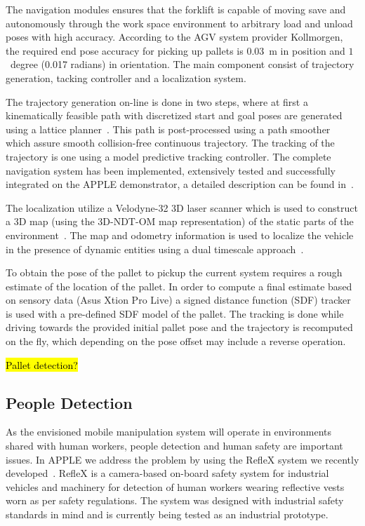 The navigation modules ensures that the forklift is capable of moving save and autonomously through the work space environment to arbitrary load and unload poses with high accuracy. According to the AGV system provider Kollmorgen, the required end pose accuracy
for picking up pallets is $0.03$~m in position and $1$~degree (0.017 radians) in
orientation. The main component consist of trajectory generation, tacking controller and a localization system. 
 
The trajectory generation on-line is done in two steps, where at first a kinematically feasible path with discretized start and goal poses are generated using a lattice planner~\cite{Ciri14}. This path is post-processed using a path smoother~\cite{Andr15} which assure smooth collision-free continuous trajectory. The tracking of the trajectory is one using a model predictive tracking controller. The complete navigation system has been implemented, extensively tested and successfully
integrated on the APPLE demonstrator, a detailed description can be found in~\cite{Andr15}.

The localization utilize a Velodyne-32 3D laser scanner which is used to construct a 3D map (using the 3D-NDT-OM map representation) of the static parts of the environment~\cite{Stoy13}. The map and odometry information is used to localize the vehicle in the presence of dynamic entities using a dual timescale approach~\cite{Vale14}. 

To obtain the pose of the pallet to pickup the current system requires a rough estimate of the location of the pallet. In order to compute a final estimate based on sensory data (Asus Xtion Pro Live) a signed distance function (SDF) tracker~\cite{Cane13} is used with a pre-defined SDF model of the pallet. The tracking is done while driving towards the provided initial pallet pose and the trajectory is recomputed on the fly, which depending on the pose offset may include a reverse operation. 

\hl{Pallet detection?}

%
\subsection{People Detection}
\label{subsec:people_det}
%
As the envisioned mobile manipulation system will operate in environments shared with human workers,
people detection and human safety are important issues. In APPLE we address the problem by using the
RefleX system we recently developed~\cite{Mosb14}. RefleX is a camera-based on-board safety system
for industrial vehicles and machinery for detection of human workers wearing reflective vests worn
as per safety regulations. The system was designed with industrial safety standards in mind and is
currently being tested as an industrial prototype.
%
